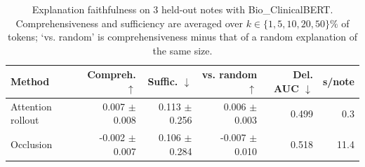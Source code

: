 \begin{table}[t]
\centering
\caption{Explanation faithfulness on 3 held-out notes with Bio_ClinicalBERT. Comprehensiveness and sufficiency are averaged over $k \in \{1,5,10,20,50\}\%$ of tokens; `vs. random' is comprehensiveness minus that of a random explanation of the same size.}
\label{tab:faithfulness}
\begin{tabular}{lrrrrr}
\toprule
Method & Compreh. $\uparrow$ & Suffic. $\downarrow$ & vs. random $\uparrow$ & Del. AUC $\downarrow$ & s/note \\
\midrule
Attention rollout & 0.007 $\pm$ 0.008 & 0.113 $\pm$ 0.256 & 0.006 $\pm$ 0.003 & 0.499 & 0.3 \\
Occlusion & -0.002 $\pm$ 0.007 & 0.106 $\pm$ 0.284 & -0.007 $\pm$ 0.010 & 0.518 & 11.4 \\
\bottomrule
\end{tabular}
\end{table}
